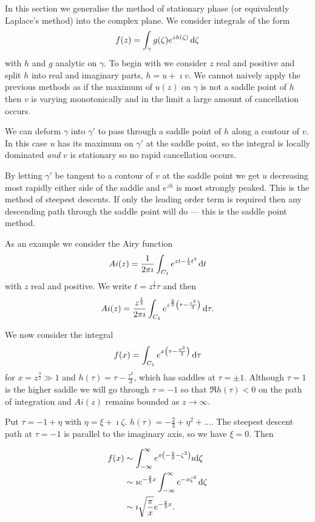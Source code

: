 \documentclass{notes}
\theoremstyle{plain}
\begin{document}
In this section we generalise the method of stationary phase (or
equivalently Laplace's method) into the complex plane.  We consider
integrals of the form
\[
f(z) = \int_{\gamma} g(\zeta) e^{z h(\zeta)}\, \mathrm{d} \zeta
\]
with $h$ and $g$ analytic on $\gamma$.  To begin with we consider $z$
real and positive and split $h$ into real and imaginary parts,
$h = u + \imath v$.  We cannot naively apply the previous methods as if
the maximum of $u(z)$ on $\gamma$ is not a saddle point of $h$ then
$v$ is varying monotonically and in the limit a large amount of cancellation
occurs.

We can deform $\gamma$ into $\gamma'$ to pass through a saddle point
of $h$ along a contour of $v$.  In this case $u$ has its maximum on
$\gamma'$ at the saddle point, so the integral is locally dominated
\emph{and} $v$ is stationary so no rapid cancellation occurs.

By letting $\gamma'$ be tangent to a contour of $v$ at the saddle point
we get $u$ decreasing most rapidly either side of the saddle and
$e^{z h}$ is most strongly peaked.  This is the method of steepest descents.
If only the leading order term is required then any descending path through
the saddle point will do --- this is the saddle point method.

As an example we consider the Airy function
\[
Ai(z) = \frac{1}{2 \pi \imath} \int_{C_1} e^{z t - \frac{1}{3}t^3}\, \mathrm{d} t
\]
with $z$ real and positive.  We write $t = z^{\frac{1}{2}} \tau$ and then
\[
Ai(z) = \frac{z^{\frac{1}{2}}}{2 \pi \imath} \int_{C_1}
e^{z^{\frac{3}{2}} \left( \tau - \frac{\tau^3}{3}\right)}\, \mathrm{d} \tau.
\]

We now consider the integral
\[
f(x) = \int_{C_1} e^{x \left(\tau - \frac{\tau^3}{3} \right)}\, \mathrm{d} \tau
\]
for $x = z^{\frac{3}{2}} \gg 1$ and $h(\tau) = \tau - \frac{\tau^3}{3}$,
which has saddles at $\tau = \pm 1$.  Although $\tau = 1$ is the higher saddle
we will go through $\tau = -1$ so that $\Re h(\tau) < 0$ on the path of
integration and $Ai(z)$ remains bounded as $z \to \infty$.

Put $\tau = -1 + \eta$ with $\eta = \xi + \imath \zeta$.  $h(\tau)
= - \frac{2}{3} + \eta^2 + \dots$.  The steepest descent path at
$\tau = -1$ is parallel to the imaginary axis, so we have $\xi = 0$.  Then

\begin{align*}
f(x) & \sim \int_{-\infty}^\infty e^{x \left( -\frac{2}{3} - \zeta^2\right)}
\imath \mathrm{d} \zeta \\
& \sim \imath e^{-\frac{2}{3}x} \int_{-\infty}^\infty e^{-x \zeta^2}\, \mathrm{d}
\zeta \\
&\sim \imath \sqrt{\frac{\pi}{x}} e^{-\frac{2}{3}x}.
\end{align*}
\end{document}
